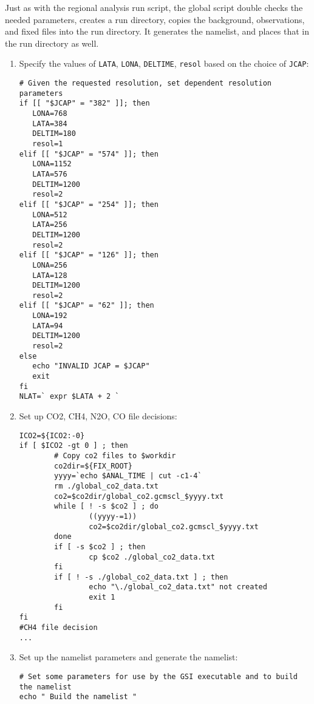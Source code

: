 Just as with the regional analysis run script, the global script double checks the needed parameters, creates a run directory, copies the background, observations, and fixed files into the run directory. It generates the namelist, and places that in the run directory as well. 
\begin{enumerate}
\item Specify the values of \verb|LATA|, \verb|LONA|, \verb|DELTIME|, \verb|resol| based on the choice of \verb|JCAP|:
\begin{scriptsize}
\begin{verbatim}
# Given the requested resolution, set dependent resolution parameters
if [[ "$JCAP" = "382" ]]; then
   LONA=768
   LATA=384
   DELTIM=180
   resol=1
elif [[ "$JCAP" = "574" ]]; then
   LONA=1152
   LATA=576
   DELTIM=1200
   resol=2
elif [[ "$JCAP" = "254" ]]; then
   LONA=512
   LATA=256
   DELTIM=1200
   resol=2
elif [[ "$JCAP" = "126" ]]; then
   LONA=256
   LATA=128
   DELTIM=1200
   resol=2
elif [[ "$JCAP" = "62" ]]; then
   LONA=192
   LATA=94
   DELTIM=1200
   resol=2
else
   echo "INVALID JCAP = $JCAP"
   exit
fi
NLAT=` expr $LATA + 2 `
\end{verbatim}
\end{scriptsize}
\item Set up CO2, CH4, N2O, CO file decisions:
\begin{scriptsize}
\begin{verbatim}
ICO2=${ICO2:-0}
if [ $ICO2 -gt 0 ] ; then
        # Copy co2 files to $workdir
        co2dir=${FIX_ROOT}
        yyyy=`echo $ANAL_TIME | cut -c1-4`
        rm ./global_co2_data.txt
        co2=$co2dir/global_co2.gcmscl_$yyyy.txt
        while [ ! -s $co2 ] ; do
                ((yyyy-=1))
                co2=$co2dir/global_co2.gcmscl_$yyyy.txt
        done
        if [ -s $co2 ] ; then
                cp $co2 ./global_co2_data.txt
        fi
        if [ ! -s ./global_co2_data.txt ] ; then
                echo "\./global_co2_data.txt" not created
                exit 1
        fi
fi
#CH4 file decision
...

\end{verbatim}
\end{scriptsize}
\item Set up the namelist parameters and generate the namelist:
\begin{scriptsize}
\begin{verbatim}
# Set some parameters for use by the GSI executable and to build the namelist
echo " Build the namelist "


\end{verbatim}
\end{scriptsize}
\end{enumerate}
